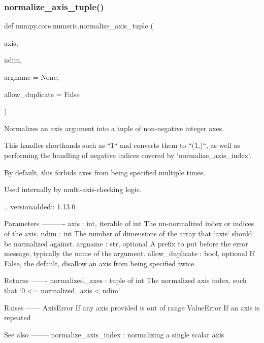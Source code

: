 \subsubsection{\texorpdfstring{normalize\+\_\+axis\+\_\+tuple()}{normalize\_axis\_tuple()}}
{\footnotesize\ttfamily def numpy.\+core.\+numeric.\+normalize\+\_\+axis\+\_\+tuple (\begin{DoxyParamCaption}\item[{}]{axis,  }\item[{}]{ndim,  }\item[{}]{argname = {\ttfamily None},  }\item[{}]{allow\+\_\+duplicate = {\ttfamily False} }\end{DoxyParamCaption})}

\begin{DoxyVerb}Normalizes an axis argument into a tuple of non-negative integer axes.

This handles shorthands such as ``1`` and converts them to ``(1,)``,
as well as performing the handling of negative indices covered by
`normalize_axis_index`.

By default, this forbids axes from being specified multiple times.

Used internally by multi-axis-checking logic.

.. versionadded:: 1.13.0

Parameters
----------
axis : int, iterable of int
    The un-normalized index or indices of the axis.
ndim : int
    The number of dimensions of the array that `axis` should be normalized
    against.
argname : str, optional
    A prefix to put before the error message, typically the name of the
    argument.
allow_duplicate : bool, optional
    If False, the default, disallow an axis from being specified twice.

Returns
-------
normalized_axes : tuple of int
    The normalized axis index, such that `0 <= normalized_axis < ndim`

Raises
------
AxisError
    If any axis provided is out of range
ValueError
    If an axis is repeated

See also
--------
normalize_axis_index : normalizing a single scalar axis
\end{DoxyVerb}
 \mbox{\label{namespacenumpy_1_1core_1_1numeric_a6bdbcb3ea5a55908e290dee2c72c0079}} 
